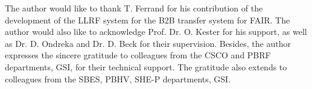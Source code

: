 The author would like to thank T. Ferrand for his contribution of the development of the LLRF system for the B2B transfer system for FAIR. The author would also like to acknowledge Prof. Dr. O. Kester for his support, as well as Dr. D. Ondreka and Dr. D. Beck for their supervision. Besides, the author expresses the sincere gratitude to colleagues from the CSCO and PBRF departments, GSI, for their technical support. The gratitude also extends to colleagues from the SBES, PBHV, SHE-P departments, GSI. 